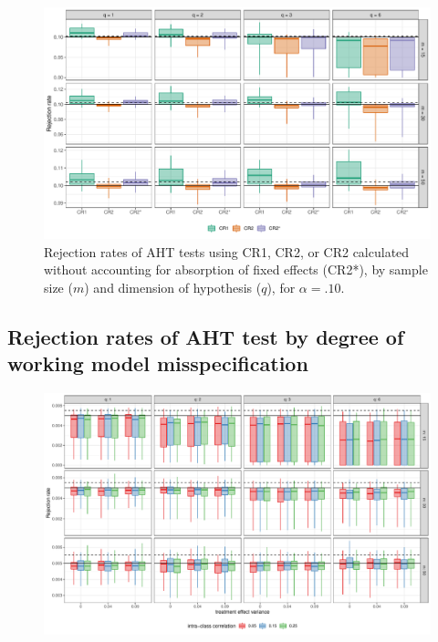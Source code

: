 \documentclass[12pt]{article}
\begin{document}
\begin{landscape}
\begin{figure}[p]

{\centering \includegraphics[width=\linewidth]{CR_fig/absorption_10-1} 

}

\caption{Rejection rates of AHT tests using CR1, CR2, or CR2 calculated without accounting for absorption of fixed effects (CR2*), by sample size ($m$) and dimension of hypothesis ($q$), for $\alpha = .10$.}\label{fig:absorption_10}
\end{figure}

\subsection{Rejection rates of AHT test by degree of working model misspecification}

\begin{figure}[p]

{\centering \includegraphics[width=\linewidth]{CR_fig/misspecification_005-1} 

}
\end{figure}
\end{landscape}
\end{document}
